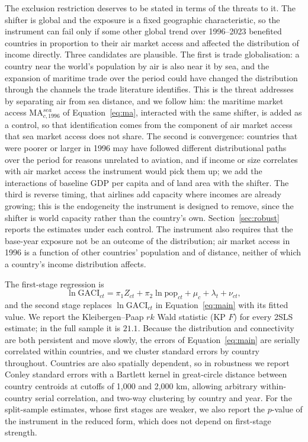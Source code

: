 The exclusion restriction deserves to be stated in terms of the threats to it. The shifter is global and the exposure is a fixed geographic characteristic, so the instrument can fail only if some other global trend over 1996--2023 benefited countries in proportion to their air market access and affected the distribution of income directly. Three candidates are plausible. The first is trade globalisation: a country near the world's population by air is also near it by sea, and the expansion of maritime trade over the period could have changed the distribution through the channels the trade literature identifies. This is the threat \citet{Feyrer_2019} addresses by separating air from sea distance, and we follow him: the maritime market access $\mathrm{MA}^{sea}_{c,1996}$ of Equation~\eqref{eq:ma}, interacted with the same shifter, is added as a control, so that identification comes from the component of air market access that sea market access does not share. The second is convergence: countries that were poorer or larger in 1996 may have followed different distributional paths over the period for reasons unrelated to aviation, and if income or size correlates with air market access the instrument would pick them up; we add the interactions of baseline GDP per capita and of land area with the shifter. The third is reverse timing, that airlines add capacity where incomes are already growing; this is the endogeneity the instrument is designed to remove, since the shifter is world capacity rather than the country's own. Section~\ref{sec:robust} reports the estimates under each control. The instrument also requires that the base-year exposure not be an outcome of the distribution; air market access in 1996 is a function of other countries' population and of distance, neither of which a country's income distribution affects.

The first-stage regression is
\begin{equation}
\ln\mathrm{GACI}_{ct} = \pi_1 Z_{ct} + \pi_2 \ln\text{pop}_{ct} + \mu_c + \lambda_t + \nu_{ct},
\label{eq:first}
\end{equation}
and the second stage replaces $\ln\mathrm{GACI}_{ct}$ in Equation~\eqref{eq:main} with its fitted value. We report the Kleibergen--Paap $rk$ Wald statistic (KP $F$) for every 2SLS estimate; in the full sample it is $21.1$. Because the distribution and connectivity are both persistent and move slowly, the errors of Equation~\eqref{eq:main} are serially correlated within countries, and we cluster standard errors by country throughout. Countries are also spatially dependent, so in robustness we report Conley standard errors \citep{Conley_1999} with a Bartlett kernel in great-circle distance between country centroids at cutoffs of 1{,}000 and 2{,}000 km, allowing arbitrary within-country serial correlation, and two-way clustering by country and year. For the split-sample estimates, whose first stages are weaker, we also report the $p$-value of the instrument in the reduced form, which does not depend on first-stage strength.

